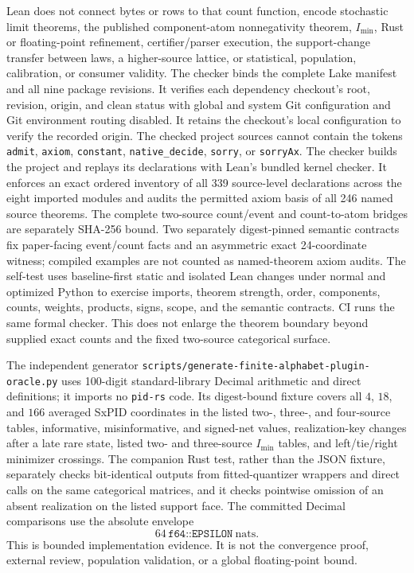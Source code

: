 \documentclass[11pt]{article}
\theoremstyle{definition}
\newcommand{\imin}{I_{\min}}
\begin{document}
Lean does not connect bytes or rows to that count function, encode stochastic limit theorems, the
published component-atom nonnegativity theorem, $\imin$, Rust or floating-point refinement,
certifier/parser execution, the support-change transfer between laws, a higher-source lattice, or
statistical, population, calibration, or consumer validity.  The checker
binds the complete Lake manifest and
all nine package revisions.  It verifies each dependency checkout's root, revision, origin, and
clean status with global and system Git configuration and Git environment routing disabled.  It
retains the checkout's local configuration to verify the recorded origin.  The checked project
sources cannot contain
the tokens \texttt{admit}, \texttt{axiom}, \texttt{constant}, \texttt{native\_decide},
\texttt{sorry}, or \texttt{sorryAx}.  The checker builds the project and replays its declarations
with Lean's bundled kernel checker.  It enforces an exact ordered inventory of all 339 source-level
declarations across the eight imported modules and audits the permitted axiom basis of all 246
named source theorems.  The complete two-source count/event and count-to-atom bridges are
separately SHA-256 bound.  Two separately digest-pinned semantic contracts fix paper-facing
event/count facts and an asymmetric exact 24-coordinate witness; compiled examples are not counted
as named-theorem axiom audits.  The self-test uses baseline-first static and isolated Lean changes
under normal and optimized Python to exercise imports, theorem strength, order, components,
counts, weights, products, signs, scope, and the semantic contracts.  CI runs the same formal
checker.  This does not enlarge the theorem boundary beyond supplied exact counts and the fixed
two-source categorical surface.

	The independent generator
	\nolinkurl{scripts/generate-finite-alphabet-plugin-oracle.py} uses 100-digit standard-library
	Decimal arithmetic and direct definitions; it imports no \texttt{pid-rs} code.  Its digest-bound
	fixture covers all $4$, $18$, and $166$ averaged SxPID coordinates in the listed two-, three-,
	and four-source tables, informative, misinformative, and signed-net values, realization-key
	changes after a late rare state, listed two- and three-source $\imin$ tables, and left/tie/right
	minimizer crossings.  The companion Rust test, rather than the JSON fixture, separately checks
	bit-identical outputs from fitted-quantizer wrappers and direct calls on the same categorical
	matrices, and it checks pointwise omission of an absent realization on the listed support face.
	The committed Decimal comparisons use the
	absolute envelope
\begin{equation}
  64\,\texttt{f64::EPSILON}\ \text{nats}.
\end{equation}
This is bounded implementation evidence.  It is not the convergence proof, external review,
population validation, or a global floating-point bound.
\end{document}
